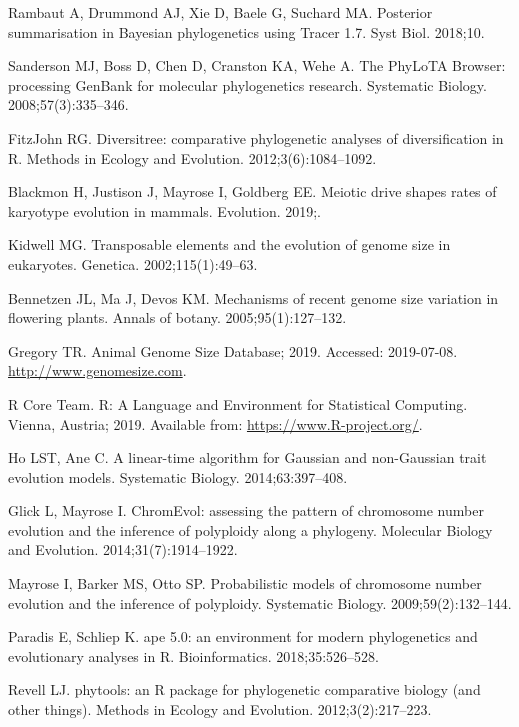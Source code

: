 \documentclass[]{rsos}%
\begin{document}
\begin{thebibliography}{9}
Rambaut A, Drummond AJ, Xie D, Baele G, Suchard MA.
 Posterior summarisation in Bayesian phylogenetics using Tracer 1.7.
 Syst Biol. 2018;10.

Sanderson MJ, Boss D, Chen D, Cranston KA, Wehe A.
 The PhyLoTA Browser: processing GenBank for molecular phylogenetics
  research.
 Systematic Biology. 2008;57(3):335--346.

FitzJohn RG.
 Diversitree: comparative phylogenetic analyses of diversification in
  {R}.
 Methods in Ecology and Evolution. 2012;3(6):1084--1092.

Blackmon H, Justison J, Mayrose I, Goldberg EE.
 Meiotic drive shapes rates of karyotype evolution in mammals.
 Evolution. 2019;.

Kidwell MG.
 Transposable elements and the evolution of genome size in eukaryotes.
 Genetica. 2002;115(1):49--63.

Bennetzen JL, Ma J, Devos KM.
 Mechanisms of recent genome size variation in flowering plants.
 Annals of botany. 2005;95(1):127--132.

Gregory TR. Animal Genome Size Database; 2019.
 Accessed: 2019-07-08.
 \url{http://www.genomesize.com}.

{R Core Team}. R: A Language and Environment for Statistical Computing.
 Vienna, Austria; 2019.
 Available from: \url{https://www.R-project.org/}.
 
Ho LST, Ane C.
 A linear-time algorithm for Gaussian and non-Gaussian trait evolution
  models.
 Systematic Biology. 2014;63:397--408.

Glick L, Mayrose I.
 ChromEvol: assessing the pattern of chromosome number evolution and
  the inference of polyploidy along a phylogeny.
 Molecular Biology and Evolution. 2014;31(7):1914--1922.

Mayrose I, Barker MS, Otto SP.
 Probabilistic models of chromosome number evolution and the inference
  of polyploidy.
 Systematic Biology. 2009;59(2):132--144.

Paradis E, Schliep K.
 ape 5.0: an environment for modern phylogenetics and evolutionary
  analyses in {R}.
 Bioinformatics. 2018;35:526--528.

Revell LJ.
 phytools: an R package for phylogenetic comparative biology (and
  other things).
 Methods in Ecology and Evolution. 2012;3(2):217--223.


\end{thebibliography}
\end{document}
